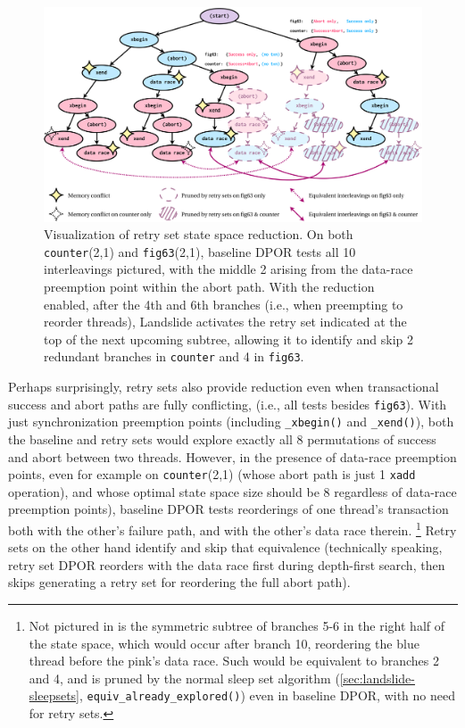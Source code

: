 \begin{figure}[t]
	\begin{center}
		\includegraphics[width=\textwidth]{retry-sets.pdf}
	\end{center}
	\caption[Number of concurrency events per iteration of each test case.]
		{Visualization of retry set state space reduction.
	On both {\tt counter}(2,1) and {\tt fig63}(2,1), baseline DPOR tests %
	all 10 interleavings pictured,
	with the middle 2 arising from the data-race preemption point within the abort path.
	With the reduction enabled,
	after the 4th and 6th branches
	(i.e., when preempting to reorder threads),
	Landslide activates the retry set
	indicated at the top of the next upcoming subtree,
	allowing it to identify and skip 2 redundant branches in {\tt counter}
	and 4 in {\tt fig63}.
	}
	\label{fig:retry-reduction}
\end{figure}

Perhaps surprisingly, retry sets also provide reduction
even when transactional success and abort paths are fully conflicting,
(i.e., all tests besides {\tt fig63}).
With just synchronization preemption points (including {\tt \_xbegin()} and {\tt \_xend()}),
both the baseline and retry sets would explore exactly all 8 permutations of success and abort between two threads.
However, in the presence of data-race preemption points,
even for example on {\tt counter}(2,1)
(whose abort path is just 1 {\tt xadd} operation),
and whose optimal state space size should be 8 regardless of data-race preemption points),
baseline DPOR tests reorderings of one thread's transaction both with the other's failure path,
and with the other's data race therein.%
\footnote{
Not pictured in  is the symmetric subtree of branches 5-6 in the right half of the state space,
which would occur after branch 10, reordering the blue thread before the pink's data race.
Such would be equivalent to branches 2 and 4,
and is pruned by the normal sleep set algorithm (\cref{sec:landslide-sleepsets}, {\tt equiv\_already\_explored()})
even in baseline DPOR, with no need for retry sets.
}
Retry sets on the other hand identify and skip that equivalence
(technically speaking, retry set DPOR reorders with the data race first during depth-first search,
then skips generating a retry set for reordering the full abort path).

